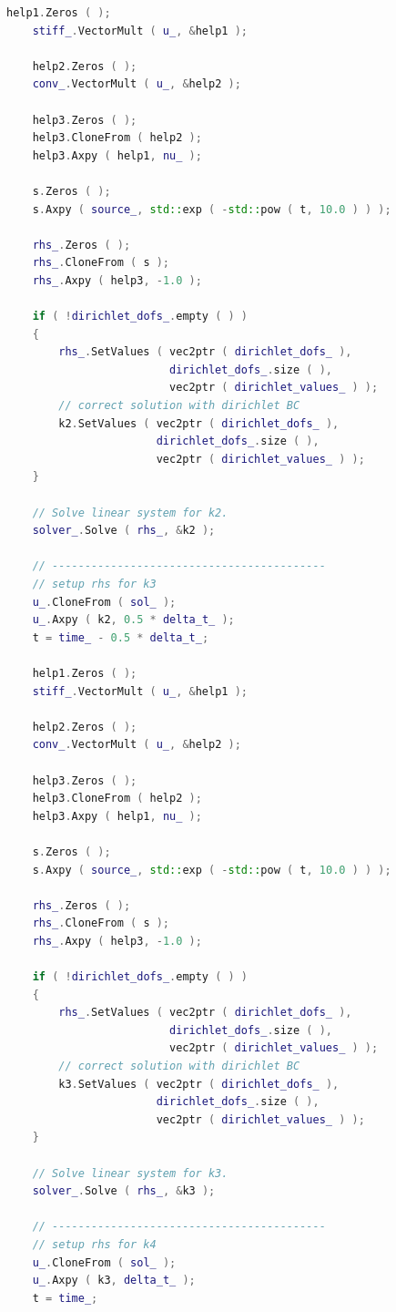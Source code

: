 \documentclass[a4paper, 11pt, twoside]{article}
\begin{document}
\begin{lstlisting}[language=C++, basicstyle={\footnotesize, \ttfamily}, keywordstyle=\color{blue}, numbers=none, tabsize=4]
    help1.Zeros ( );
    stiff_.VectorMult ( u_, &help1 );

    help2.Zeros ( );
    conv_.VectorMult ( u_, &help2 );

    help3.Zeros ( );
    help3.CloneFrom ( help2 );
    help3.Axpy ( help1, nu_ );

    s.Zeros ( );
    s.Axpy ( source_, std::exp ( -std::pow ( t, 10.0 ) ) );

    rhs_.Zeros ( );
    rhs_.CloneFrom ( s );
    rhs_.Axpy ( help3, -1.0 );

    if ( !dirichlet_dofs_.empty ( ) )
    {
        rhs_.SetValues ( vec2ptr ( dirichlet_dofs_ ), 
                         dirichlet_dofs_.size ( ), 
                         vec2ptr ( dirichlet_values_ ) );
        // correct solution with dirichlet BC
        k2.SetValues ( vec2ptr ( dirichlet_dofs_ ), 
                       dirichlet_dofs_.size ( ), 
                       vec2ptr ( dirichlet_values_ ) );
    }

    // Solve linear system for k2.
    solver_.Solve ( rhs_, &k2 );

    // ------------------------------------------
    // setup rhs for k3
    u_.CloneFrom ( sol_ );
    u_.Axpy ( k2, 0.5 * delta_t_ );
    t = time_ - 0.5 * delta_t_;

    help1.Zeros ( );
    stiff_.VectorMult ( u_, &help1 );

    help2.Zeros ( );
    conv_.VectorMult ( u_, &help2 );

    help3.Zeros ( );
    help3.CloneFrom ( help2 );
    help3.Axpy ( help1, nu_ );

    s.Zeros ( );
    s.Axpy ( source_, std::exp ( -std::pow ( t, 10.0 ) ) );

    rhs_.Zeros ( );
    rhs_.CloneFrom ( s );
    rhs_.Axpy ( help3, -1.0 );

    if ( !dirichlet_dofs_.empty ( ) )
    {
        rhs_.SetValues ( vec2ptr ( dirichlet_dofs_ ), 
                         dirichlet_dofs_.size ( ), 
                         vec2ptr ( dirichlet_values_ ) );
        // correct solution with dirichlet BC
        k3.SetValues ( vec2ptr ( dirichlet_dofs_ ), 
                       dirichlet_dofs_.size ( ), 
                       vec2ptr ( dirichlet_values_ ) );
    }

    // Solve linear system for k3.
    solver_.Solve ( rhs_, &k3 );

    // ------------------------------------------
    // setup rhs for k4
    u_.CloneFrom ( sol_ );
    u_.Axpy ( k3, delta_t_ );
    t = time_;


\end{lstlisting}
\end{document}

